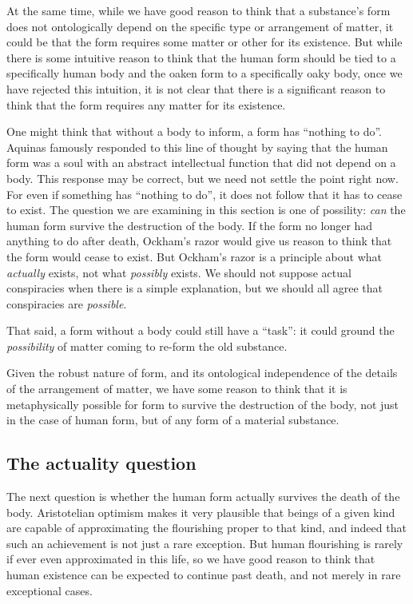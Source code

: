 At the same time, while we have good reason to think that a substance's form does not ontologically depend on the specific type or arrangement of matter, it could be that the form requires some matter or other for its existence. But while there is some intuitive 
reason to think that the human form should be tied to a specifically human body and the oaken form to a specifically oaky body,
once we have rejected this intuition, it is not clear that there is a significant reason to think that the form requires any 
matter for its existence. 

One might think that without a body to inform, a form has ``nothing to do''. Aquinas famously responded to this line of thought
by saying that the human form was a soul with an abstract intellectual function that did not depend on a body. This response may 
be correct, but we need not settle the point right now. For even if something has ``nothing to do'', it does not follow that 
it has to cease to exist. The question we are examining in this section is one of possility: \textit{can} the human form survive the 
destruction of the body. If the form no longer had anything to do after death, Ockham's razor would give us reason to think that the form would cease to exist. But Ockham's razor is a principle about what \textit{actually} exists, not what \textit{possibly}
exists. We should not suppose actual conspiracies when there is a simple explanation, but we should all agree that conspiracies
are \textit{possible}. 

That said, a form without a body could still have a ``task'': it could ground the \textit{possibility} of matter coming
to re-form the old substance. 

Given the robust nature of form, and its ontological independence of the details of the arrangement of matter, we have some 
reason to think that it is metaphysically possible for form to survive the destruction of the body, not just in the case of 
human form, but of any form of a material substance.

\subsection{The actuality question}
The next question is whether the human form actually survives the death of the body. Aristotelian optimism makes it very 
plausible that beings of a given kind are capable of approximating the flourishing proper to that kind, and indeed that such 
an achievement is not just a rare exception. But human flourishing is rarely if ever even approximated in this life, so we have 
good reason to think that human existence can be expected to continue past death, and not merely in rare exceptional cases. 

